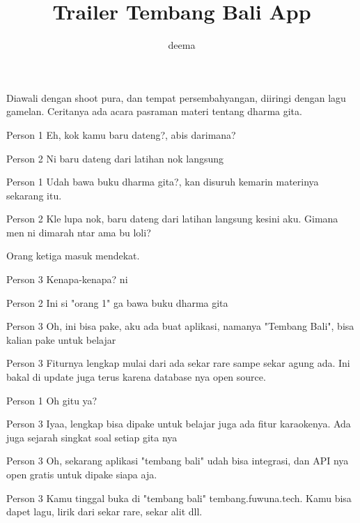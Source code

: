 \documentclass{screenplay}[2012/06/30]
\title{Trailer Tembang Bali App}
\author{deema}
\begin{document}
\maketitle

Diawali dengan shoot pura, dan tempat persembahyangan, diiringi dengan lagu gamelan. Ceritanya ada acara pasraman materi tentang dharma gita.
\begin{dialogue}{Person 1}
    Eh, kok kamu baru dateng?, abis darimana?
\end{dialogue}
\begin{dialogue}{Person 2}
    Ni baru dateng dari latihan nok langsung
\end{dialogue}
\begin{dialogue}{Person 1}
    Udah bawa buku dharma gita?, kan disuruh kemarin materinya sekarang itu.
\end{dialogue}
\begin{dialogue}{Person 2}
    Kle lupa nok, baru dateng dari latihan langsung kesini aku. Gimana men ni dimarah ntar ama bu loli?
\end{dialogue}
Orang ketiga masuk mendekat.
\begin{dialogue}{Person 3}
    Kenapa-kenapa? ni
\end{dialogue}
\begin{dialogue}{Person 2}
    Ini si "orang 1" ga bawa buku dharma gita
\end{dialogue}
\begin{dialogue}{Person 3}
    Oh, ini bisa pake, aku ada buat aplikasi, namanya "Tembang Bali", bisa kalian pake untuk belajar
\end{dialogue}
\begin{dialogue}{Person 3}
    Fiturnya lengkap mulai dari ada sekar rare sampe sekar agung ada. Ini bakal di update juga terus karena database nya open source.
\end{dialogue}
\begin{dialogue}{Person 1}
    Oh gitu ya?
\end{dialogue}
\begin{dialogue}{Person 3}
    Iyaa, lengkap bisa dipake untuk belajar juga ada fitur karaokenya. Ada juga sejarah singkat soal setiap gita nya
\end{dialogue}
\begin{dialogue}{Person 3}
    Oh, sekarang aplikasi "tembang bali" udah bisa integrasi, dan API nya open gratis untuk dipake siapa aja.
\end{dialogue}
\begin{dialogue}{Person 3}
    Kamu tinggal buka di "tembang bali" tembang.fuwuna.tech. Kamu bisa dapet lagu, lirik dari sekar rare, sekar alit dll.
\end{dialogue}
\end{document}
